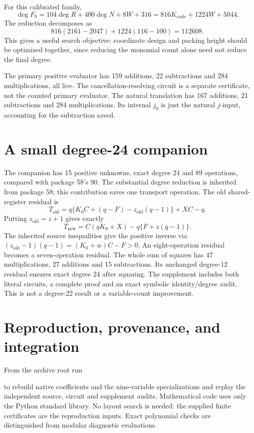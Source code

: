 \documentclass[11pt,a4paper]{article}
\theoremstyle{remark}
\newcommand{\Kcode}{K_{\mathrm{code}}}
\newcommand{\code}[1]{\texttt{\detokenize{#1}}}
\begin{document}
For this calibrated family,
\[
 \deg F_9=104\deg R+400\deg N+8W+316
        =816\Kcode+1224W+5044 .
\]
The reduction decomposes as
\[
 816(2161-2047)+1224(116-100)=112608 .
\]
This gives a useful search objective: coordinate design and packing
height should be optimized together, since reducing the monomial
count alone need not reduce the final degree.

The primary positive evaluator has 159 additions, 22 subtractions
and 284 multiplications, all live. The cancellation-resolving
circuit is a separate certificate, not the counted primary evaluator.
The natural translation has 167 additions, 21 subtractions and
284 multiplications. Its internal \(j_0\) is just the natural
\(j\)-input, accounting for the subtraction saved.

\section{A small degree-24 companion}
\label{sec:low}

The companion has 15 positive unknowns, exact degree 24 and
89 operations, compared with package 58's 90.
The substantial degree reduction is inherited from package 58;
this contribution saves one transport operation.
The old shared-register residual is
\[
 T_{\mathrm{old}}
 =q\{K_0C+(q-F)-z_{\mathrm{old}}(q-1)\}+XC-q.
\]
Putting \(z_{\mathrm{old}}=z+1\) gives exactly
\begin{equation}
 \boxed{T_{\mathrm{new}}=C(qK_0+X)-q\{F+z(q-1)\}.}
\label{eq:transport-low}
\end{equation}
The inherited source inequalities give the positive inverse via
\((z_{\mathrm{old}}-1)(q-1)=(K_0+w)C-F>0\).
An eight-operation residual becomes a seven-operation residual.
The whole sum of squares has 47 multiplications, 27 additions and
15 subtractions. Its unchanged degree-12 residual ensures exact
degree 24 after squaring. The supplement includes both literal
circuits, a complete proof and an exact symbolic identity/degree audit.
This is not a degree-22 result or a variable-count improvement.



\section{Reproduction, provenance, and integration}
\label{sec:repro}

From the archive root run
\begin{quote}
\code{python3 checks/verify_all.py}
\end{quote}
to rebuild native coefficients and the nine-variable specializations
and replay the independent source, circuit and supplement audits.
Mathematical code uses only the Python standard library.
No layout search is needed: the supplied finite certificates are
the reproduction inputs. Exact polynomial checks are distinguished
from modular diagnostic evaluations.
\end{document}
